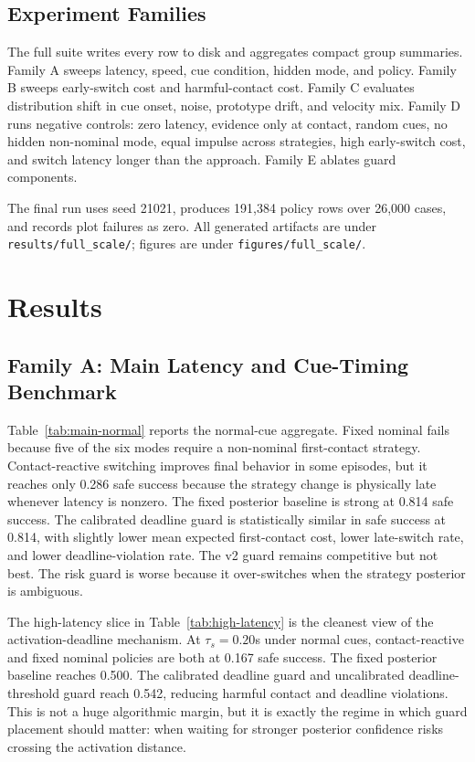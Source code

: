 \documentclass{article}
\begin{document}
\subsection{Experiment Families}

The full suite writes every row to disk and aggregates compact group summaries. Family A sweeps latency, speed, cue condition, hidden mode, and policy. Family B sweeps early-switch cost and harmful-contact cost. Family C evaluates distribution shift in cue onset, noise, prototype drift, and velocity mix. Family D runs negative controls: zero latency, evidence only at contact, random cues, no hidden non-nominal mode, equal impulse across strategies, high early-switch cost, and switch latency longer than the approach. Family E ablates guard components.

The final run uses seed 21021, produces 191,384 policy rows over 26,000 cases, and records plot failures as zero. All generated artifacts are under \texttt{results/full\_scale/}; figures are under \texttt{figures/full\_scale/}.

\section{Results}

\subsection{Family A: Main Latency and Cue-Timing Benchmark}

Table~\ref{tab:main-normal} reports the normal-cue aggregate. Fixed nominal fails because five of the six modes require a non-nominal first-contact strategy. Contact-reactive switching improves final behavior in some episodes, but it reaches only 0.286 safe success because the strategy change is physically late whenever latency is nonzero. The fixed posterior baseline is strong at 0.814 safe success. The calibrated deadline guard is statistically similar in safe success at 0.814, with slightly lower mean expected first-contact cost, lower late-switch rate, and lower deadline-violation rate. The v2 guard remains competitive but not best. The risk guard is worse because it over-switches when the strategy posterior is ambiguous.



The high-latency slice in Table~\ref{tab:high-latency} is the cleanest view of the activation-deadline mechanism. At $\tau_s=0.20$s under normal cues, contact-reactive and fixed nominal policies are both at 0.167 safe success. The fixed posterior baseline reaches 0.500. The calibrated deadline guard and uncalibrated deadline-threshold guard reach 0.542, reducing harmful contact and deadline violations. This is not a huge algorithmic margin, but it is exactly the regime in which guard placement should matter: when waiting for stronger posterior confidence risks crossing the activation distance.
\end{document}
